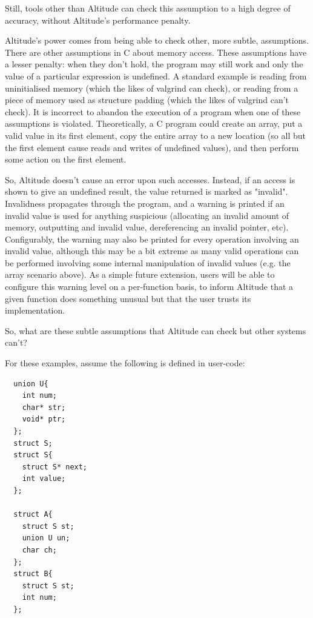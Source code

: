 \documentclass[10pt,a4paper]{report}
\begin{document}
Still, tools other than Altitude can check this assumption to a high degree of accuracy, without Altitude's performance penalty.

Altitude's power comes from being able to check other, more subtle, assumptions. There are other assumptions in C about memory access. These assumptions have a lesser penalty: when they don't hold, the program may still work and only the value of a particular expression is undefined. A standard example is reading from uninitialised memory (which the likes of valgrind can check), or reading from a piece of memory used as structure padding (which the likes of valgrind can't check). It is incorrect to abandon the execution of a program when one of these assumptions is violated. Theoretically, a C program could create an array, put a valid value in its first element, copy the entire array to a new location (so all but the first element cause reads and writes of undefined values), and then perform some action on the first element.

So, Altitude doesn't cause an error upon such accesses. Instead, if an access is shown to give an undefined result, the value returned is marked as "invalid". Invalidness propagates through the program, and a warning is printed if an invalid value is used for anything suspicious (allocating an invalid amount of memory, outputting and invalid value, dereferencing an invalid pointer, etc). Configurably, the warning may also be printed for every operation involving an invalid value, although this may be a bit extreme as many valid operations can be performed involving some internal manipulation of invalid values (e.g. the array scenario above). As a simple future extension, users will be able to configure this warning level on a per-function basis, to inform Altitude that a given function does something unusual but that the user trusts its implementation.

So, what are these subtle assumptions that Altitude can check but other systems can't?

For these examples, assume the following is defined in user-code:

\begin{verbatim}
  union U{
    int num;
    char* str;
    void* ptr;
  };
  struct S;
  struct S{
    struct S* next;
    int value;
  };

  struct A{
    struct S st;
    union U un;
    char ch;
  };
  struct B{
    struct S st;
    int num;
  };

\end{verbatim}
\end{document}
